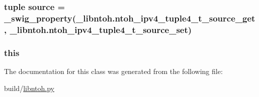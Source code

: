 \hypertarget{classlibntoh_1_1ntoh__ipv4__tuple4__t_aa873026052cc3e5ba03877243fcb7ecd}{
\subsubsection[{source}]{\setlength{\rightskip}{0pt plus 5cm}tuple source = {\bf \-\_\-swig\-\_\-property}(\-\_\-libntoh.\-ntoh\-\_\-ipv4\-\_\-tuple4\-\_\-t\-\_\-source\-\_\-get, \-\_\-libntoh.\-ntoh\-\_\-ipv4\-\_\-tuple4\-\_\-t\-\_\-source\-\_\-set)\hspace{0.3cm}{\ttfamily [static]}}}\label{classlibntoh_1_1ntoh__ipv4__tuple4__t_aa873026052cc3e5ba03877243fcb7ecd}
\hypertarget{classlibntoh_1_1ntoh__ipv4__tuple4__t_a05c09a5e9d53fa7adf0a7936038c2fa3}{
\subsubsection[{this}]{\setlength{\rightskip}{0pt plus 5cm}this}}\label{classlibntoh_1_1ntoh__ipv4__tuple4__t_a05c09a5e9d53fa7adf0a7936038c2fa3}


The documentation for this class was generated from the following file\-:\begin{DoxyCompactItemize}
\item 
build/\hyperlink{libntoh_8py}{libntoh.\-py}\end{DoxyCompactItemize}

